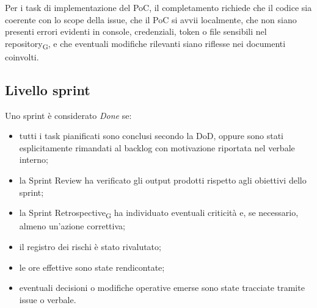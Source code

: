 Per i task di implementazione del PoC, il completamento richiede che il codice
sia coerente con lo scope della issue, che il PoC si avvii localmente, che non
siano presenti errori evidenti in console, credenziali, token o file sensibili
nel repository\textsubscript{G}, e che eventuali modifiche rilevanti siano
riflesse nei documenti coinvolti.

\subsection{Livello sprint}
\label{sec:dod-sprint}

Uno sprint è considerato \textit{Done} se:
\begin{itemize}
\item tutti i task pianificati sono conclusi secondo la DoD, oppure sono
stati esplicitamente rimandati al backlog con motivazione riportata
nel verbale interno;
\item la Sprint Review ha verificato gli output prodotti rispetto agli
obiettivi dello sprint;
\item la Sprint Retrospective\textsubscript{G} ha individuato eventuali
criticità e, se necessario, almeno un'azione correttiva;
\item il registro dei rischi è stato rivalutato;
\item le ore effettive sono state rendicontate;
\item eventuali decisioni o modifiche operative emerse sono state tracciate
tramite issue o verbale.
\end{itemize}
